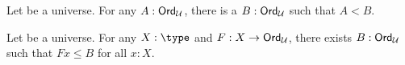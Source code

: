 \documentclass[hott-all.tex]{subfiles}
\begin{document}
% 
% 
% 
\begin{lem}
  Let \bbU be a universe.
  For any $A:\mathsf{Ord}_\mathcal{U}$, there is a $B:\mathsf{Ord}_\mathcal{U}$ such that $A<B$.
\end{lem}
% 
% 
% 
% 
% 
% 
\begin{lem}
  Let \bbU be a universe.
  For any $X:\type$ and $F:X\to \mathsf{Ord}_\mathcal{U}$, there exists $B:\mathsf{Ord}_\mathcal{U}$ such that $Fx\le B$ for all $x:X$.
\end{lem}
% 
% 
% 
\end{document}
